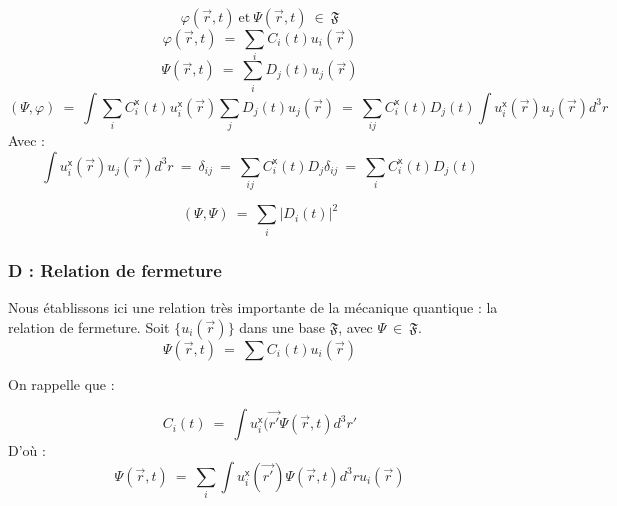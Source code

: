 \documentclass[12pt,a4paper,titlepage]{book}
\begin{document}
\begin{equation*}
\varphi (\overrightarrow{r}, t) ~\text{et}~ \Psi (\overrightarrow{r}, t) ~\in~ \mathfrak{F}
\end{equation*}
\begin{equation*}
\varphi (\overrightarrow{r}, t) ~=~ \sum\limits_{i} C_i (t) u_i (\overrightarrow{r})
\end{equation*}
\begin{equation*}
\Psi (\overrightarrow{r}, t) ~=~ \sum\limits_{i} D_j (t) u_j (\overrightarrow{r})
\end{equation*}
\begin{equation*}
(\Psi, \varphi) ~=~ \int \sum\limits_{i} C_i^{\mathsf{x}} (t) u_i^{\mathsf{x}} (\overrightarrow{r}) \sum\limits_{j} D_j (t) u_j (\overrightarrow{r}) ~=~ \sum\limits_{ij} C_i^{\mathsf{x}} (t) D_j (t) \int u_i^{\mathsf{x}} (\overrightarrow{r}) u_j (\overrightarrow{r}) d^3 r
\end{equation*}
Avec :\\
\begin{equation*}
\int u_i^{\mathsf{x}} (\overrightarrow{r}) u_j (\overrightarrow{r}) d^3 r ~=~ \delta_{ij} ~=~ \sum\limits_{ij} C_i^{\mathsf{x}} (t) D_j \delta_{ij} ~=~ \sum\limits_{i} C_i^{\mathsf{x}} (t) D_j (t)
\end{equation*}

\begin{equation*}
(\Psi, \Psi) ~=~ \sum\limits_{i} \vert D_i (t) \vert ^2
\end{equation*}

\subsubsection{D : Relation de fermeture}

Nous établissons ici une relation très importante de la mécanique quantique : la relation de fermeture. Soit $\lbrace u_i (\overrightarrow{r}) \rbrace$ dans une base $\mathfrak{F}$, avec $\Psi ~\in~ \mathfrak{F}$.
\begin{equation*}
\Psi (\overrightarrow{r}, t) ~=~ \sum C_i (t) u_i (\overrightarrow{r})
\end{equation*}

On rappelle que :

\begin{equation*}
C_i (t) ~=~ \int u_i^{\mathsf{x}} (\overrightarrow{r'} \Psi (\overrightarrow{r}, t) d^3 r'
\end{equation*}
D'où :
\begin{equation*}
\Psi (\overrightarrow{r}, t) ~=~ \sum\limits_i \int u_i^{\mathsf{x}} (\overrightarrow{r'}) \Psi (\overrightarrow{r}, t) d^3 r u_i (\overrightarrow{r})
\end{equation*}
\end{document}
